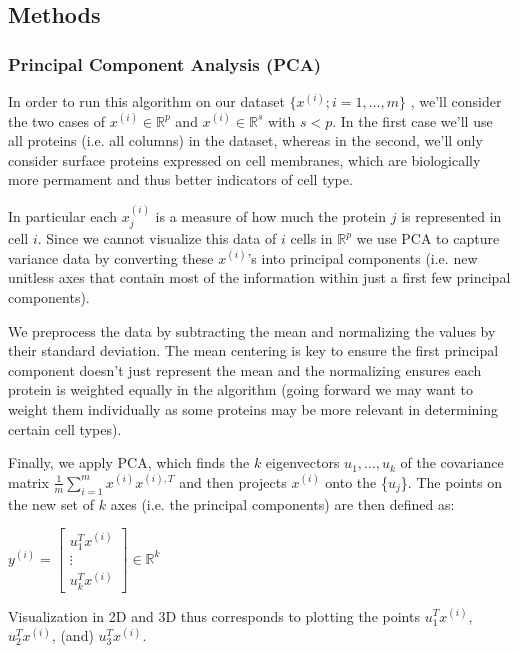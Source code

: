 \documentclass{article} %
\begin{document}
\subsection{Methods}

\subsubsection{Principal Component Analysis (PCA)}
In order to run this algorithm on our dataset {$ \{x^{(i)}; i=1,\ldots,m\} $} , we'll consider the two cases of $x^{(i)} \in \mathbb{R}^p$ and $x^{(i)} \in \mathbb{R}^s$ with $s<p$. In the first case we'll use all proteins (i.e. all columns) in the dataset, whereas in the second, we'll only consider surface proteins expressed on cell membranes, which are biologically more permament and thus better indicators of cell type. 

In particular each {$x_j^{(i)}$} is a measure of how much the protein {$ j $} is represented in cell {$i$}. Since we cannot visualize this data of {$ i $} cells in {$ \mathbb{R}^p $} we use PCA to capture variance data by converting these {$x^{(i)}$}'s into principal components (i.e. new unitless axes that contain most of the information within just a first few principal components).

We preprocess the data by subtracting the mean and normalizing the values by their standard deviation. The mean centering is key to ensure the first principal component doesn't just represent the mean and the normalizing ensures each protein is weighted equally in the algorithm (going forward we may want to weight them individually as some proteins may be more relevant in determining certain cell types). 

Finally, we apply PCA, which finds the {$ k $} eigenvectors {$ u_1,\ldots,u_k $} of the covariance matrix {$\frac{1}{m}\sum_{i=1}^m x^{(i)}x^{(i),T}$} and then projects $x^{(i)}$ onto the \{$u_j$\}. The points on the new set of $k$ axes (i.e. the principal components) are then defined as:

\begin{center}
{$ y^{(i)} = \left[ {\begin{array}{cc}
   u_1^Tx^{(i)}  \\
   \vdots  \\
   u_k^Tx^{(i)}
  \end{array} } \right] \in \mathbb{R}^{k} $}
\end{center}

Visualization in 2D and 3D thus corresponds to plotting the points $u_1^Tx^{(i)}$, $u_2^Tx^{(i)}$, (and) $u_3^Tx^{(i)}$.
\end{document}
